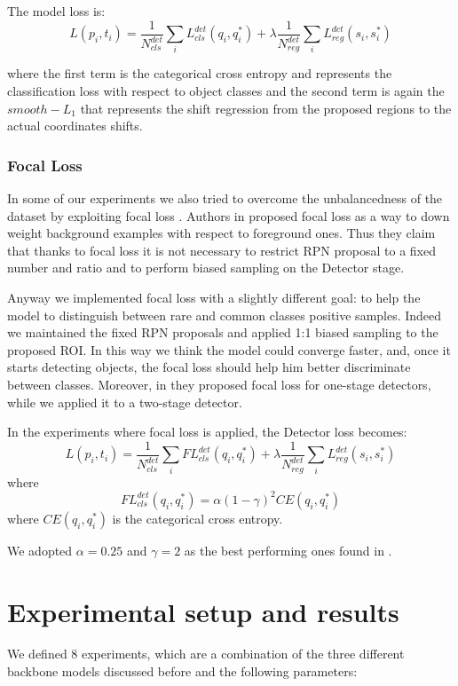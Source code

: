 \documentclass[a4paper,10pt]{report}
\begin{document}
The model loss is:
\[L({p_i}, {t_i}) = \dfrac{1}{N_{cls}^{det}} \sum_{i} L_{cls}^{det}(q_i, q_i^*) + \lambda \dfrac{1}{N_{reg}^{det}} \sum_{i}L_{reg}^{det}(s_i, s_i^*) \]

where the first term is the categorical cross entropy and represents the classification loss with respect to object classes and the second term is again the $smooth-L_1$ that represents the shift regression from the proposed regions to the actual coordinates shifts.

\subsection{Focal Loss}\label{subsec:focal-loss}
In some of our experiments we also tried to overcome the unbalancedness of the dataset by exploiting focal loss \cite{focal-loss}.
Authors in \cite{focal-loss} proposed focal loss as a way to down weight background examples with respect to foreground ones. Thus they claim that thanks to focal loss it is not necessary to restrict RPN proposal to a fixed number and ratio and to perform biased sampling on the Detector stage.

Anyway we implemented focal loss with a slightly different goal: to help the model to distinguish between rare and common classes positive samples. Indeed we maintained the fixed RPN proposals and applied 1:1 biased sampling to the proposed ROI. In this way we think the model could converge faster, and, once it starts detecting objects, the focal loss should help him better discriminate between classes.
Moreover, in \cite{focal-loss} they proposed focal loss for one-stage detectors, while we applied it to a two-stage detector.

In the experiments where focal loss is applied, the Detector loss becomes:
\[L({p_i}, {t_i}) = \dfrac{1}{N_{cls}^{det}} \sum_{i} FL_{cls}^{det}(q_i, q_i^*) + \lambda \dfrac{1}{N_{reg}^{det}} \sum_{i}L_{reg}^{det}(s_i, s_i^*) \]
where
\[FL_{cls}^{det}(q_i, q_i^*) = \alpha (1-\gamma)^2 CE(q_i, q_i^*)\]
where $CE(q_i, q_i^*)$ is the categorical cross entropy. 

We adopted $\alpha=0.25$ and $\gamma=2$ as the best performing ones found in \cite{focal-loss}.

\chapter{Experimental setup and results}\label{chap:experiments}
 We defined 8 experiments, which are a combination of the three different backbone models discussed before and the following parameters:
\end{document}
